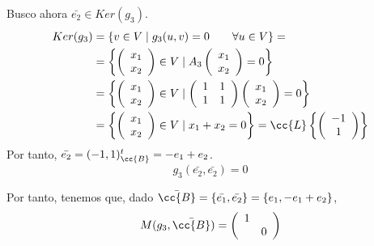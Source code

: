 \begin{ejercicio}
\begin{enumerate}
        Busco ahora $\bar{e_2} \in Ker(g_3)$.
        \begin{equation*}\begin{split}
            Ker(g_3) &= \{v \in V \mid g_3(u,v) = 0 \qquad \forall u\in V\} 
            =\\
            &= \left\{ \left(\begin{array}{c}
                 x_1 \\ x_2
            \end{array} \right) \in V \mid
            A_3
            \left(\begin{array}{c}
                 x_1 \\ x_2
            \end{array} \right) = 0\right\} \\
            &= \left\{ \left(\begin{array}{c}
                 x_1 \\ x_2
            \end{array} \right) \in V \mid \left(\begin{array}{cc}
                1 & 1 \\
                1 & 1
            \end{array} \right) 
            \left(\begin{array}{c}
                 x_1 \\ x_2
            \end{array} \right) = 0\right\} \\
            &= \left\{ \left(\begin{array}{c}
                 x_1 \\ x_2
            \end{array} \right) \in V \mid x_1+x_2 = 0\right\}
            = \cc{L} \left\{ \left(\begin{array}{c}
                 -1 \\ 1
            \end{array} \right) \right\}
        \end{split}\end{equation*}
        Por tanto, $\bar{e_2} = (-1,1)^t_\cc{B} = -e_1+e_2$.
        \begin{equation*}
            g_3(\bar{e_2}, \bar{e_2}) = 0
        \end{equation*}

        Por tanto, tenemos que, dado $\bar{\cc{B}} = \{\bar{e_1},\bar{e_2}\} = \{e_1, -e_1+e_2\}$,
        \begin{equation*}
            M(g_3, \bar{\cc{B}}) = \left(\begin{array}{cc}
            1 &  \\
             & 0
        \end{array} \right)
        \end{equation*}


\end{enumerate}
\end{ejercicio}
